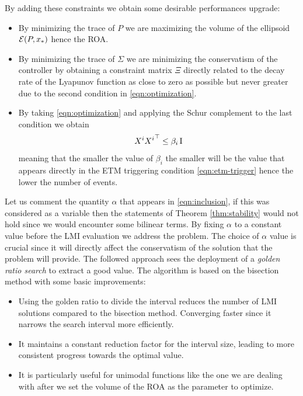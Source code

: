 \documentclass{ifacconf}
\theoremstyle{plain}
\begin{document}
By adding these constraints we obtain some desirable performances upgrade:
\begin{itemize}
  \item By minimizing the trace of $P$ we are maximizing the volume of the ellipsoid ${\mathcal{E}}(P, x_*)$ hence the ROA.
  \item By minimizing the trace of $\Sigma$ we are minimizing the conservatism of the controller by obtaining a constraint matrix $\Xi$ directly related to the decay rate of the Lyapunov function as close to zero as possible but never greater due to the second condition in \eqref{eqn:optimization}.
  \item By taking \eqref{eqn:optimization} and applying the Schur complement to the last condition we obtain
  $$
  X^i {X^i}^\top \leq \beta_i \operatorname{I}
  $$
  meaning that the smaller the value of $\beta_i$ the smaller will be the value that appears directly in the ETM triggering condition \eqref{eqn:etm-trigger} hence the lower the number of events.
\end{itemize}
{\color{red}{Vorrei migliorare questa parte}}

Let us comment the quantity $\alpha$ that appears in \eqref{eqn:inclusion}, if this was considered as a variable then the statements of Theorem \ref{thm:stability} would not hold since we would encounter some bilinear terms. By fixing $\alpha$ to a constant value before the LMI evaluation we address the problem. The choice of $\alpha$ value is crucial since it will directly affect the conservatism of the solution that the problem will provide. The followed approach sees the deployment of a \emph{golden ratio search} to extract a good value. The algorithm is based on the bisection method with some basic improvements:
\begin{itemize}
  \item Using the golden ratio to divide the interval reduces the number of LMI solutions compared to the bisection method. Converging faster since it narrows the search interval more efficiently.
  \item It maintains a constant reduction factor for the interval size, leading to more consistent progress towards the optimal value.
  \item It is particularly useful for unimodal functions like the one we are dealing with after we set the volume of the ROA as the parameter to optimize.
\end{itemize}
\end{document}
